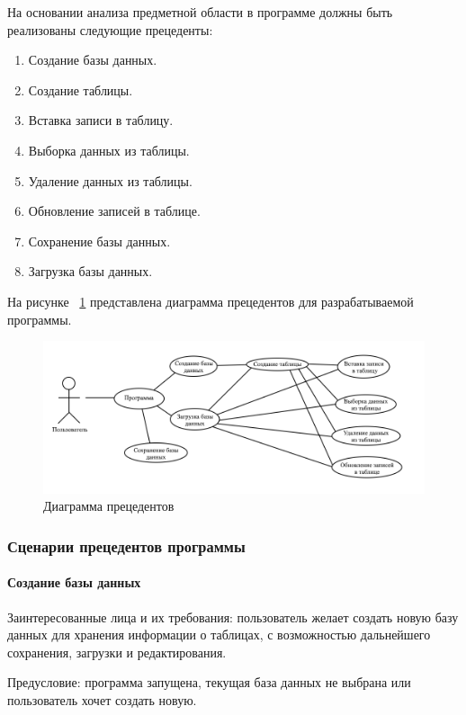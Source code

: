 На основании анализа предметной области в программе должны быть реализованы следующие прецеденты:
\begin{enumerate}
	\item Создание базы данных.
	\item Создание таблицы.
	\item Вставка записи в таблицу.
	\item Выборка данных из таблицы.
	\item Удаление данных из таблицы.
	\item Обновление записей в таблице.
	\item Сохранение базы данных.
	\item Загрузка базы данных.
\end{enumerate}

На рисунке ~\ref{fig:prec} представлена диаграмма прецедентов для разрабатываемой программы.

\begin{figure}[H]
	\centering
	\includegraphics[width=1\linewidth]{images/prec}
	\caption{Диаграмма прецедентов}
	\label{fig:prec}
\end{figure}

\subsubsection{Сценарии прецедентов программы}

\paragraph{Создание базы данных}

Заинтересованные лица и их требования: пользователь желает создать новую базу данных для хранения информации о таблицах, с возможностью дальнейшего сохранения, загрузки и редактирования.

Предусловие: программа запущена, текущая база данных не выбрана или пользователь хочет создать новую.

